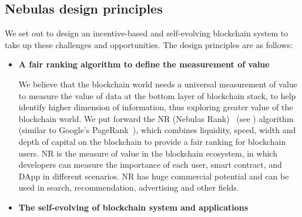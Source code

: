 \subsection{Nebulas design principles}
We set out to design an incentive-based and self-evolving blockchain system to take up these challenges and opportunities. The design principles are as follows:
\begin{itemize}
	\item \textbf{A fair ranking algorithm to define the measurement of value}

We believe that the blockchain world needs a universal measurement of value to measure the value of data at the bottom layer of blockchain stack, to help identify higher dimension of information, thus exploring greater value of the blockchain world. We put forward the NR (Nebulas Rank) ~(see ) algorithm (similar to Google's PageRank~\cite{Brin2010}\cite{page1999pagerank}), which combines liquidity, speed, width and depth of capital on the blockchain to provide a fair ranking for blockchain users. NR is the measure of value in the blockchain ecosystem, in which developers can measure the importance of each user, smart contract, and DApp in different scenarios. NR has huge commercial potential and can be used in search, recommendation, advertising and other fields.

\item \textbf{The self-evolving of blockchain system and applications}


\end{itemize}
